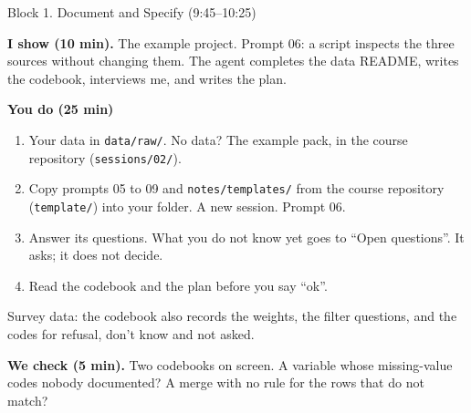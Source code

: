 \documentclass[svgnames,x11names,dvipsnames]{beamer}
\begin{document}
\begin{frame}{Block 1. Document and Specify (9:45--10:25)}

\small
\textbf{I show (10 min).} The example project. Prompt 06: a script inspects the three sources without changing them. The agent completes the data README, writes the codebook, interviews me, and writes the plan.

\vspace{0.3cm}

\textbf{You do (25 min)}
\begin{enumerate}
    \setlength{\itemsep}{3pt}
    \item Your data in \texttt{data/raw/}. No data? The example pack, in the course repository (\texttt{sessions/02/}).
    \item Copy prompts 05 to 09 and \texttt{notes/templates/} from the course repository (\texttt{template/}) into your folder. A new session. Prompt 06.
    \item Answer its questions. What you do not know yet goes to ``Open questions''. It asks; it does not decide.
    \item Read the codebook and the plan before you say ``ok''.
\end{enumerate}

\vspace{0.1cm}
{\footnotesize Survey data: the codebook also records the weights, the filter questions, and the codes for refusal, don't know and not asked.}

\vspace{0.25cm}

\textbf{We check (5 min).} Two codebooks on screen. A variable whose missing-value codes nobody documented? A merge with no rule for the rows that do not match?

\end{frame}
\end{document}
